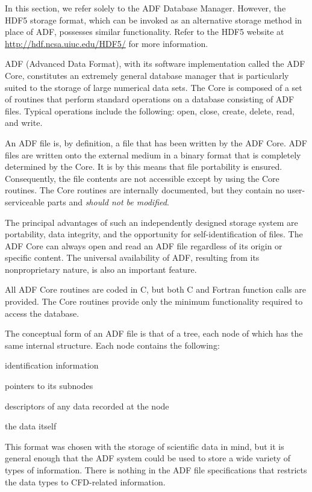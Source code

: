In this section, we refer solely to the ADF Database Manager.  
However, the HDF5 storage format, which can be invoked as an alternative
storage method in place of ADF, possesses similar functionality.
Refer to the HDF5 website at \url{http://hdf.ncsa.uiuc.edu/HDF5/} for
more information.

ADF (Advanced Data Format), with its software implementation called the
ADF Core, constitutes an extremely general database manager that is
particularly suited to the storage of large numerical data sets.
The Core is composed of a set of routines that perform standard
operations on a database consisting of ADF files.
Typical operations include the following: open, close, create, delete,
read, and write.

An ADF file is, by definition, a file that has been written by the ADF
Core.
ADF files are written onto the external medium in a binary format that
is completely determined by the Core.
It is by this means that file portability is ensured.
Consequently, the file contents are not accessible except by using the
Core routines.
The Core routines are internally documented, but they contain no
user-serviceable parts and \emph{should not be modified}.

The principal advantages of such an independently designed storage
system are portability, data integrity, and the opportunity for
self-identification of files.
The ADF Core can always open and read an ADF file regardless of its
origin or specific content.
The universal availability of ADF, resulting from its nonproprietary
nature, is also an important feature.

All ADF Core routines are coded in C, but both C and Fortran function
calls are provided.
The Core routines provide only the minimum functionality required to
access the database.

The conceptual form of an ADF file is that of a tree, each node of which
has the same internal structure.
Each node contains the following:

\begin{itemize*}
\item identification information
\item pointers to its subnodes
\item descriptors of any data recorded at the node
\item the data itself
\end{itemize*}

This format was chosen with the storage of scientific data in mind, but
it is general enough that the ADF system could be used to store a wide
variety of types of information.
There is nothing in the ADF file specifications that restricts the data
types to CFD-related information.

